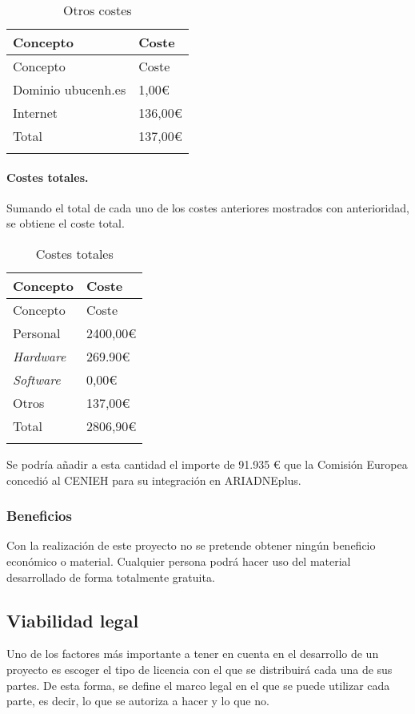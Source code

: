 \begin{longtable}[]{@{}ll@{}}
\toprule
Concepto & Coste\tabularnewline
\midrule
\endfirsthead
\toprule
Concepto & Coste\tabularnewline
\midrule
\endhead
Dominio ubucenh.es & 1,00\euro{}\tabularnewline
Internet & 136,00\euro{}\tabularnewline
Total & 137,00\euro{}\tabularnewline
\bottomrule
\caption{Otros costes}\tabularnewline
\end{longtable}

\paragraph{Costes totales.}

Sumando el total de cada uno de los costes anteriores mostrados con
anterioridad, se obtiene el coste total.

\begin{longtable}[]{@{}ll@{}}
\toprule
Concepto & Coste\tabularnewline
\midrule
\endfirsthead
\toprule
Concepto & Coste\tabularnewline
\midrule
\endhead
Personal & 2400,00\euro{}\tabularnewline
\emph{Hardware} & 269.90\euro{}\tabularnewline
\emph{Software} & 0,00\euro{}\tabularnewline
Otros & 137,00\euro{}\tabularnewline
Total & 2806,90\euro{}\tabularnewline
\bottomrule
\caption{Costes totales}\tabularnewline
\end{longtable}

Se podría añadir a esta cantidad el importe de 91.935 \euro{} que la Comisión
Europea concedió al CENIEH para su integración en ARIADNEplus.

\subsubsection{Beneficios}

Con la realización de este proyecto no se pretende obtener ningún
beneficio económico o material. Cualquier persona podrá hacer uso del
material desarrollado de forma totalmente gratuita.

\subsection{Viabilidad legal}

Uno de los factores más importante a tener en cuenta en el desarrollo de
un proyecto es escoger el tipo de licencia con el que se distribuirá
cada una de sus partes. De esta forma, se define el marco legal en el
que se puede utilizar cada parte, es decir, lo que se autoriza a hacer y
lo que no.


